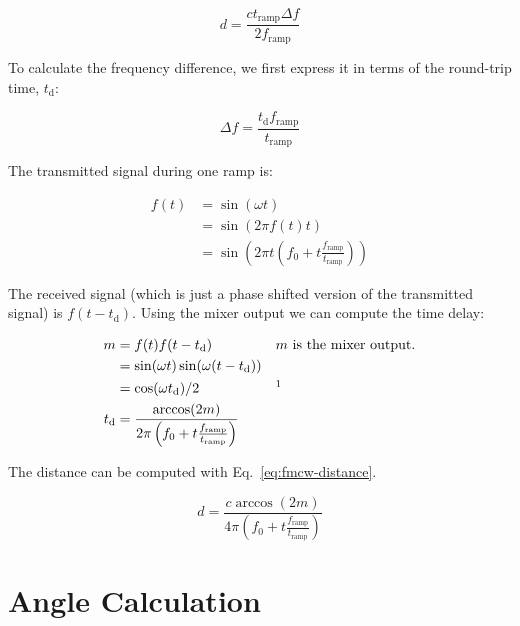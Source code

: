 \documentclass{default}
\begin{document}
\begin{equation}
        \label{eq:fmcw-principle}
        d = \frac{c t_{\text{ramp}} \Delta f}{2 f_{\text{ramp}}}
\end{equation}

To calculate the frequency difference, we first express it in terms of the round-trip time,
$t_{\text{d}}$:

\begin{equation}
        \Delta f = \frac{t_{\text{d}} f_{\text{ramp}}}{t_{\text{ramp}}}
\end{equation}

The transmitted signal during one ramp is:

\begin{align}
  f(t) &= \sin\left(\omega t\right) \\
       &= \sin\left(2 \pi f(t) t\right) \\
       &= \sin\left(2 \pi t \left( f_0 + t \frac{f_{\text{ramp}}}{t_{\text{ramp}}} \right) \right)
\end{align}

The received signal (which is just a phase shifted version of the transmitted signal) is
$f(t-t_{\text{d}})$. Using the mixer output we can compute the time delay:

\begin{align}
  m &= f(t) f(t-t_{\text{d}}) && \text{$m$ is the mixer output.} \\
    &= \sin(\omega t) \sin(\omega (t-t_{\text{d}})) \\
    &= \cos(\omega t_{\text{d}})/2 && \text{\footnotemark} \\
  t_{\text{d}} &= \frac{\arccos(2m)}{2 \pi \left(f_0 + t \frac{f_{\text{ramp}}}{t_{\text{ramp}}} \right)}
\end{align}

The distance can be computed with Eq.~\ref{eq:fmcw-distance}.

\begin{equation}
        \label{eq:fmcw-distance}
        d = \frac{c \arccos(2m)}{4 \pi \left(f_0 + t \frac{f_{\text{ramp}}}{t_{\text{ramp}}} \right)}
\end{equation}

\section{Angle Calculation}
\label{sec:angle}
\end{document}

